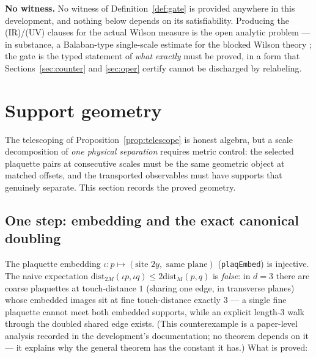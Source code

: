\documentclass[11pt]{article}
\theoremstyle{definition}
\newcommand{\lean}[1]{\texttt{#1}}
\newcommand{\dist}{\mathrm{dist}}
\begin{document}
\medskip
\noindent\textbf{No witness.}  No witness of
Definition~\ref{def:gate} is provided anywhere in this development,
and nothing below depends on its satisfiability.  Producing the
(IR)/(UV) clauses for the actual Wilson measure is the open analytic
problem --- in substance, a Balaban-type single-scale estimate for the
blocked Wilson theory \cite{Bal87,Bal88a,Bal88b,Bal89,Dim13a}; the
gate is the typed statement of \emph{what exactly} must be proved, in
a form that Sections~\ref{sec:counter} and \ref{sec:oper} certify
cannot be discharged by relabeling.

\section{Support geometry}\label{sec:support}

The telescoping of Proposition~\ref{prop:telescope} is honest algebra,
but a scale decomposition of \emph{one physical separation} requires
metric control: the selected plaquette pairs at consecutive scales
must be the same geometric object at matched offsets, and the
transported observables must have supports that genuinely separate.
This section records the proved geometry.

\subsection{One step: embedding and the exact canonical doubling}

The plaquette embedding
$\iota : p \mapsto (\text{site } 2y, \text{ same plane})$
(\lean{plaqEmbed}) is injective.  The naive expectation
$\dist_{2M}(\iota p, \iota q) \le 2 \dist_M(p, q)$ is \emph{false}:
in $d = 3$ there are coarse plaquettes at touch-distance $1$ (sharing
one edge, in transverse planes) whose embedded images sit at fine
touch-distance exactly $3$ --- a single fine plaquette cannot meet
both embedded supports, while an explicit length-$3$ walk through the
doubled shared edge exists.  (This counterexample is a paper-level
analysis recorded in the development's documentation; no theorem
depends on it --- it explains why the general theorem has the constant
it has.)  What is proved:
\end{document}
